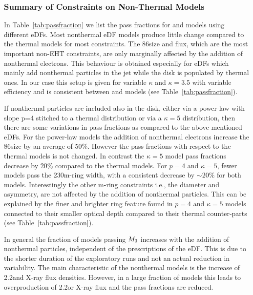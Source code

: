 \subsubsection{Summary of Constraints on Non-Thermal Models}



In Table~\ref{tab:passfraction} we list the pass fractions for \bhac and \hamr models using different eDFs.
Most nonthermal eDF models produce little change compared to the thermal models for most constraints.
The 86\GHz size and flux, which are the most important non-EHT constraints, are only marginally affected by the addition of nonthermal electrons.
This behaviour is obtained especially for eDFs which mainly add nonthermal particles in the jet while the disk is populated by thermal ones.
In our case this setup is given for variable $\kappa$ and $\kappa=3.5$ with variable efficiency and is consistent between \bhac and \hamr models (see Table~\ref{tab:passfraction}).

If nonthermal particles are included also in the disk, either via a power-law with slope p=4 stitched to a thermal distribution or via a $\kappa=5$ distribution, then there are some variations in pass fractions as compared to the above-mentioned eDFs.  For the power-law models the addition of nonthermal electrons increase the 86\GHz size by an average of 50\%.
However the pass fractions with respect to the thermal models is not changed.
In contrast the $\kappa=5$ model pass fractions decrease by 20\% compared to the thermal models.
For $p=4$ and $\kappa=5$, fewer models pass the 230\GHz m-ring width, with a consistent decrease by $\sim20\%$ for both models.
Interestingly the other m-ring constraints i.e., the diameter and asymmetry, are not affected by the addition of nonthermal particles.
This can be explained by the finer and brighter ring feature found in $p=4$ and $\kappa=5$ models connected to their smaller optical depth compared to their thermal counter-parts (see Table~\ref{tab:passfraction}).

In general the fraction of models passing $M_{3}$ increases with the addition of nonthermal particles, independent of the prescriptions of the eDF.  This is due to the shorter duration of the exploratory runs and not an actual reduction in variability.   The main characteristic of the nonthermal models is the increase of 2.2\um and X-ray flux densities. However, in a large fraction of models this leads to overproduction of 2.2\um or X-ray flux and the pass fractions are reduced.

